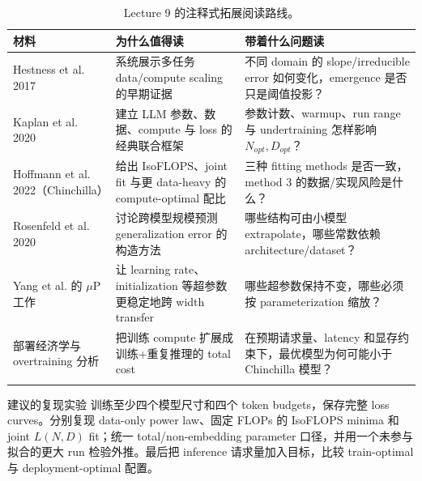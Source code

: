 \begin{longtable}{L{0.24\textwidth}L{0.30\textwidth}L{0.36\textwidth}}
\toprule
材料 & 为什么值得读 & 带着什么问题读 \\
\midrule
Hestness et al. 2017 & 系统展示多任务 data/compute scaling 的早期证据 & 不同 domain 的 slope/irreducible error 如何变化，emergence 是否只是阈值投影？ \\
Kaplan et al. 2020 & 建立 LLM 参数、数据、compute 与 loss 的经典联合框架 & 参数计数、warmup、run range 与 undertraining 怎样影响 $N_{opt},D_{opt}$？ \\
Hoffmann et al. 2022（Chinchilla） & 给出 IsoFLOPS、joint fit 与更 data-heavy 的 compute-optimal 配比 & 三种 fitting methods 是否一致，method 3 的数据/实现风险是什么？ \\
Rosenfeld et al. 2020 & 讨论跨模型规模预测 generalization error 的构造方法 & 哪些结构可由小模型 extrapolate，哪些常数依赖 architecture/dataset？ \\
Yang et al. 的 $\mu$P 工作 & 让 learning rate、initialization 等超参数更稳定地跨 width transfer & 哪些超参数保持不变，哪些必须按 parameterization 缩放？ \\
部署经济学与 overtraining 分析 & 把训练 compute 扩展成训练+重复推理的 total cost & 在预期请求量、latency 和显存约束下，最优模型为何可能小于 Chinchilla 模型？ \\
\bottomrule
\caption{Lecture 9 的注释式拓展阅读路线。}
\end{longtable}

\begin{importantbox}{建议的复现实验}
训练至少四个模型尺寸和四个 token budgets，保存完整 loss curves。分别复现 data-only power law、固定 FLOPs 的 IsoFLOPS minima 和 joint $L(N,D)$ fit；统一 total/non-embedding parameter 口径，并用一个未参与拟合的更大 run 检验外推。最后把 inference 请求量加入目标，比较 train-optimal 与 deployment-optimal 配置。
\end{importantbox}


